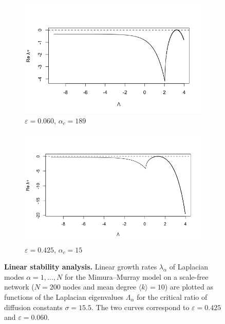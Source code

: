 \begin{figure}[H] %
  \centering
  \begin{subfigure}{0.48\textwidth}
    \centering
    \includegraphics[width=\linewidth]{Graphs/growth-rate_vs_eigen189.png}
    \caption{\(\varepsilon=0.060\), \(\alpha_c=189\)}
  \end{subfigure}\hfill
  \begin{subfigure}{0.48\textwidth}
    \centering
    \includegraphics[width=\linewidth]{Graphs/growth-rate_vs_eigen15.png}
    \caption{\(\varepsilon=0.425\), \(\alpha_c=15\)}
  \end{subfigure}
  \caption{\textbf{Linear stability analysis.} Linear growth rates \(\lambda_\alpha\) of Laplacian modes \(\alpha=1,\ldots,N\)
  for the Mimura–Murray model on a scale-free network (\(N=200\) nodes and mean degree \(\langle k\rangle=10\)) are plotted as functions of the Laplacian eigenvalues \(\Lambda_\alpha\) for the critical ratio of diffusion constants \(\sigma=15.5\). The two curves correspond to \(\varepsilon=0.425\) and \(\varepsilon=0.060\).}
  \label{fig:critical_find}
\end{figure}

